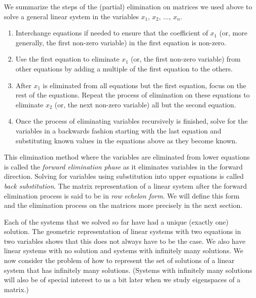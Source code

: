We summarize the steps of the (partial) elimination on matrices we used above to solve a general linear system in the variables $x_1$, $x_2$, $\ldots$, $x_n$.
\begin{enumerate}
\item Interchange equations if needed to ensure that the coefficient of $x_1$ (or, more generally, the first non-zero variable) in the first equation is non-zero.
\item Use the first equation to eliminate $x_1$ (or, the first non-zero variable) from other equations by adding a multiple of the first equation to the others.
\item After $x_1$ is eliminated from all equations but the first equation, focus on the rest of the equations. Repeat the process of elimination on these equations to eliminate $x_2$  (or, the next non-zero variable) all but the second equation. 
\item Once the process of eliminating variables recursively is finished, solve for the variables in a backwards fashion starting with the last equation and substituting known values in the equations above as they become known.
\end{enumerate}
This elimination method where the variables are eliminated from lower equations is called the \emph{forward elimination phase} as it eliminates variables in the forward direction. Solving for variables using substitution into upper equations is called \emph{back substitution}. The matrix representation of a linear system after the forward elimination process is said to be in \emph{row echelon form}. We will define this form and the elimination process on the matrices more precisely in the next section.

\label{sec:sys_inf_sols}

Each of the systems that we solved so far have had a unique (exactly one) solution. The geometric representation of linear systems with two equations in two variables shows that this does not always have to be the case. We also have linear systems with no solution and systems with infinitely many solutions. We now consider the problem of how to represent the set of solutions of a linear system that has infinitely many solutions. (Systems with infinitely many solutions will also be of special interest to us a bit later when we study eigenspaces of a matrix.)



